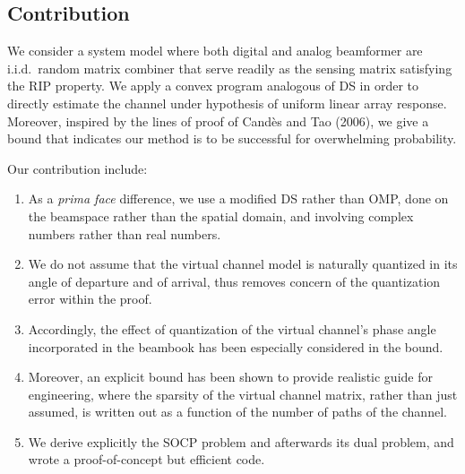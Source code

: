 \subsection{Contribution}

We consider a system model where both digital and analog beamformer are i.i.d.\ random matrix combiner that serve readily as the sensing matrix satisfying the RIP property.
We apply a convex program analogous of DS in order to directly estimate the channel under hypothesis of uniform linear array response.
Moreover, inspired by the lines of proof of Cand\`es and Tao (2006), we give a bound that indicates our method is to be successful for overwhelming probability.

Our contribution include:

\begin{enumerate}
\item As a \textit{prima face} difference, we use a modified DS rather than OMP, done on the beamspace rather than the spatial domain, and involving complex numbers rather than real numbers.
\item We do not assume that the virtual channel model is naturally quantized in its angle of departure and of arrival, thus removes concern of the quantization error within the proof.
\item Accordingly, the effect of quantization of the virtual channel's phase angle incorporated in the beambook has been especially considered in the bound.
\item Moreover, an explicit bound has been shown to provide realistic guide for engineering, where the sparsity of the virtual channel matrix, rather than just assumed, is written out as a function of the number of paths of the channel.
\item We derive explicitly the SOCP problem and afterwards its dual problem, and wrote a proof-of-concept but efficient code.
\end{enumerate}

